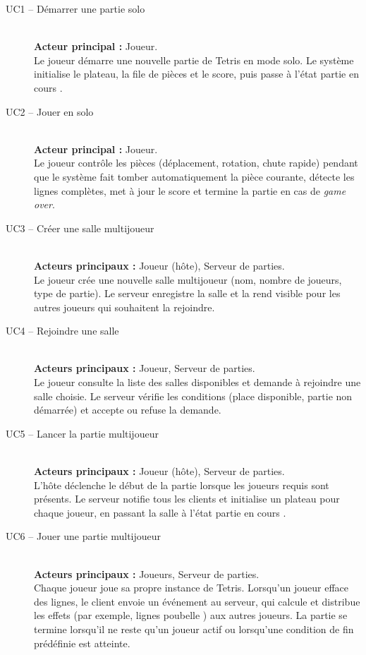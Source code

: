\documentclass[a4paper,11pt]{article}
\begin{document}
\begin{description}

  \item[UC1 -- Démarrer une partie solo]%
  \hfill\\
  \textbf{Acteur principal :} Joueur.\\
  Le joueur démarre une nouvelle partie de Tetris en mode solo. Le système
  initialise le plateau, la file de pièces et le score, puis passe à l'état
  \og partie en cours \fg.

  \item[UC2 -- Jouer en solo]%
  \hfill\\
  \textbf{Acteur principal :} Joueur.\\
  Le joueur contrôle les pièces (déplacement, rotation, chute rapide) pendant que
  le système fait tomber automatiquement la pièce courante, détecte les lignes
  complètes, met à jour le score et termine la partie en cas de \emph{game over}.

  \item[UC3 -- Créer une salle multijoueur]%
  \hfill\\
  \textbf{Acteurs principaux :} Joueur (hôte), Serveur de parties.\\
  Le joueur crée une nouvelle salle multijoueur (nom, nombre de joueurs, type de
  partie). Le serveur enregistre la salle et la rend visible pour les autres
  joueurs qui souhaitent la rejoindre.

  \item[UC4 -- Rejoindre une salle]%
  \hfill\\
  \textbf{Acteurs principaux :} Joueur, Serveur de parties.\\
  Le joueur consulte la liste des salles disponibles et demande à rejoindre une
  salle choisie. Le serveur vérifie les conditions (place disponible, partie
  non démarrée) et accepte ou refuse la demande.

  \item[UC5 -- Lancer la partie multijoueur]%
  \hfill\\
  \textbf{Acteurs principaux :} Joueur (hôte), Serveur de parties.\\
  L'hôte déclenche le début de la partie lorsque les joueurs requis sont
  présents. Le serveur notifie tous les clients et initialise un plateau pour
  chaque joueur, en passant la salle à l'état \og partie en cours \fg.

  \item[UC6 -- Jouer une partie multijoueur]%
  \hfill\\
  \textbf{Acteurs principaux :} Joueurs, Serveur de parties.\\
  Chaque joueur joue sa propre instance de Tetris. Lorsqu'un joueur efface des
  lignes, le client envoie un événement au serveur, qui calcule et distribue
  les effets (par exemple, lignes \og poubelle \fg) aux autres joueurs. La partie
  se termine lorsqu'il ne reste qu'un joueur actif ou lorsqu'une condition de fin
  prédéfinie est atteinte.


\end{description}
\end{document}
